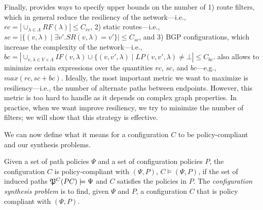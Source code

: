 Finally, \name provides ways to specify upper bounds on the number of
1) route filters, which in general reduce the resiliency of the network---i.e., $rc=|\cup_{\lambda\in \Lambda} RF(\lambda)|\leq C_{rc}$,
2) static routes---i.e., $sc=|\{(v,\lambda)\mid \exists v'. SR(v,\lambda)=v'\}|\leq C_{sc}$, and
3) BGP configurations, which increase the complexity of the network---i.e., 
$bc=|\cup_{v,\lambda\in V\times\Lambda} IF(v,\lambda)\cup \{(v,v',\lambda)\mid LP(v,v',\lambda)\neq \bot|\leq C_{bc}$.
\name also allows to minimize certain expressions over the quantities $rc$, $sc$, and $bc$---e.g., $max(rc, sc+bc)$. 
Ideally, the most important metric we want to maximize is resiliency---i.e.,
the number of alternate paths between endpoints.
However, this metric is too hard to handle as it depends on complex graph properties. 
In practice, when we want improve resiliency, we try to minimize
the number of filters; we will show that this strategy is effective. 




\noindent We can now define what it means for a configuration $C$ to be policy-compliant
and our synthesis problems.
\begin{definition} \label{def:policycompliance}
	Given a set of path policies $\Psi$ and a set of configuration policies $P$,
	the configuration $C$ is policy-compliant with $(\Psi,P)$,
	$C \models (\Psi,P)$, if the set of
	induced paths $\mathfrak{P}^C(PC) \models \Psi$
	and $C$ satisfies the policies in $P$.
	The \emph{configuration synthesis problem} is to find, given $\Psi$ and $P$,
a configuration $C$ that is policy compliant with $(\Psi,P)$.
\end{definition}

